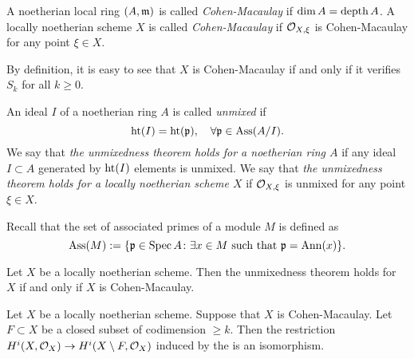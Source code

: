     \begin{definition}
        A noetherian local ring $(A,{\mathfrak{m}})$ is called \textit{Cohen-Macaulay} if $\dim A = \operatorname{depth} A$.
        A locally noetherian scheme $X$ is called \textit{Cohen-Macaulay} if $\mathcal{O}_{X,\xi}$ is Cohen-Macaulay for any point $\xi \in X$.
    \end{definition}

    By definition, it is easy to see that $X$ is Cohen-Macaulay if and only if it verifies $S_k$ for all $k \geq 0$.

    \begin{example}

    \end{example}

    \begin{definition}
        An ideal $I$ of a noetherian ring $A$ is called \textit{unmixed} if 
        \[ \operatorname{ht}(I) = \operatorname{ht}({\mathfrak{p}}), \quad \forall {\mathfrak{p}} \in \operatorname{Ass}(A/I). \]
        We say that \textit{the unmixedness theorem holds for a noetherian ring $A$} if any ideal $I \subset A$ generated by $\operatorname{ht}(I)$ elements is unmixed.
        We say that \textit{the unmixedness theorem holds for a locally noetherian scheme $X$} if $\mathcal{O}_{X,\xi}$ is unmixed for any point $\xi \in X$.
    \end{definition}

    \begin{remark}
        Recall that the set of associated primes of a module $M$ is defined as
        \[ \operatorname{Ass}(M) := \{ {\mathfrak{p}} \in \operatorname{Spec} A \colon \exists x \in M \text{ such that } {\mathfrak{p}} = \operatorname{Ann}(x) \}. \] 
        
    \end{remark}

    \begin{theorem}
        Let $X$ be a locally noetherian scheme.
        Then the unmixedness theorem holds for $X$ if and only if $X$ is Cohen-Macaulay.
    \end{theorem}

    \begin{theorem}
        Let $X$ be a locally noetherian scheme.
        Suppose that $X$ is Cohen-Macaulay.
        Let $F \subset X$ be a closed subset of codimension $\geq k$.
        Then the restriction $H^i(X,\mathcal{O}_X) \to H^i(X\setminus F, \mathcal{O}_{X})$ induced by the 
         is an isomorphism.
    \end{theorem}


